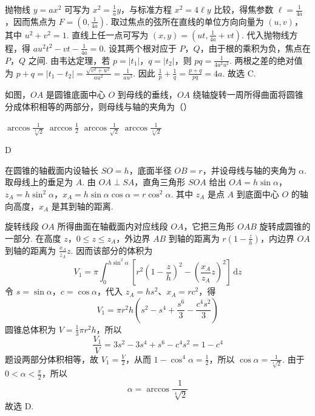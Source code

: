 \begin{solution}
抛物线 \(y=ax^{2}\) 可写为 \(x^{2}=\frac{1}{a}y\)，与标准方程 \(x^{2}=4\ell y\) 比较，得焦参数 \(\ell=\frac{1}{4a}\)，因而焦点为 \(F=\left(0,\frac{1}{4a}\right)\). 取过焦点的弦所在直线的单位方向向量为 \((u,v)\)，其中 \(u^{2}+v^{2}=1\). 直线上任一点可写为 \((x,y)=\left(ut,\frac{1}{4a}+vt\right)\). 代入抛物线方程，得 \(a u^{2}t^{2}-vt-\frac{1}{4a}=0\).
设其两个根对应于 \(P\)，\(Q\)，由于根的乘积为负，焦点在 \(P\)，\(Q\) 之间. 由韦达定理，若 \(p=|t_{1}|\)，\(q=|t_{2}|\)，则
\(pq=\frac{1}{4a^{2}u^{2}}\).
两根之差的绝对值为 \(p+q=|t_{1}-t_{2}|=\frac{\sqrt{v^{2}+u^{2}}}{a u^{2}}=\frac{1}{a u^{2}}\).
因此 \(\frac{1}{p}+\frac{1}{q}=\frac{p+q}{pq}=4a\).
故选 C.
\end{solution}

\begin{problem}
如图，\(OA\) 是圆锥底面中心 \(O\) 到母线的垂线，\(OA\) 绕轴旋转一周所得曲面将圆锥分成体积相等的两部分，则母线与轴的夹角为（\quad）


\choices
    {\(\arccos\frac{1}{\sqrt[3]{2}}\)}
    {\(\arccos\frac{1}{2}\)}
    {\(\arccos\frac{1}{\sqrt{2}}\)}
    {\(\arccos\frac{1}{\sqrt[4]{2}}\)}
\end{problem}

\begin{answer}
D
\end{answer}

\begin{solution}
在圆锥的轴截面内设轴长 \(SO=h\)，底面半径 \(OB=r\)，并设母线与轴的夹角为 \(\alpha\). 取母线上的垂足为 \(A\). 由 \(OA\perp SA\)，直角三角形 \(SOA\) 给出
\(OA=h\sin\alpha\)，\(z_A=h\sin^{2}\alpha\)，\(x_A=h\sin\alpha\cos\alpha=r\cos^{2}\alpha\).
其中 \(z_A\) 是点 \(A\) 到底面中心 \(O\) 的轴向高度，\(x_A\) 是其到轴的距离.

旋转线段 \(OA\) 所得曲面在轴截面内对应线段 \(OA\)，它把三角形 \(OAB\) 旋转成圆锥的一部分. 在高度 \(z\)，\(0\leqslant z\leqslant z_A\)，外边界 \(AB\) 到轴的距离为 \(r\left(1-\frac{z}{h}\right)\)，内边界 \(OA\) 到轴的距离为 \(\frac{x_A}{z_A}z\). 因而该部分的体积为
\[
V_1=\pi\int_{0}^{h\sin^{2}\alpha}
\left[r^{2}\left(1-\frac{z}{h}\right)^{2}-\left(\frac{x_A}{z_A}z\right)^{2}\right]\,\mathrm{d}z
\]
令 \(s=\sin\alpha\)，\(c=\cos\alpha\)，代入 \(z_A=hs^{2}\)、\(x_A=rc^{2}\)，得
\[
V_1=\pi r^{2}h\left(s^{2}-s^{4}+\frac{s^{6}}{3}-\frac{c^{4}s^{2}}{3}\right)
\]
圆锥总体积为 \(V=\frac{1}{3}\pi r^{2}h\)，所以
\[
\frac{V_1}{V}=3s^{2}-3s^{4}+s^{6}-c^{4}s^{2}=1-c^{4}
\]
题设两部分体积相等，故 \(V_1=\frac{V}{2}\)，从而
\(1-\cos^{4}\alpha=\frac{1}{2}\)，所以 \(\cos\alpha=\frac{1}{\sqrt[4]{2}}\).
由于 \(0<\alpha<\frac{\pi}{2}\)，所以
\[
\alpha=\arccos\frac{1}{\sqrt[4]{2}}
\]
故选 D.
\end{solution}


